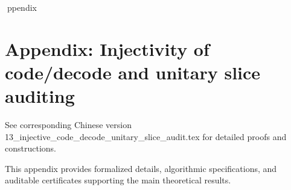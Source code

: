ppendix

\section*{Appendix: Injectivity of code/decode and unitary slice auditing}

See corresponding Chinese version 13_injective_code_decode_unitary_slice_audit.tex for detailed proofs and constructions.

This appendix provides formalized details, algorithmic specifications, and auditable certificates supporting the main theoretical results.
